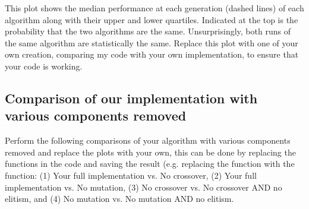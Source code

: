 \documentclass{article}
\begin{document}
	This plot shows the median performance at each generation (dashed lines) of each algorithm along with their upper and lower quartiles. Indicated at the top is the probability that the two algorithms are the same. Unsurprisingly, both runs of the same algorithm are statistically the same. Replace this plot with one of your own creation, comparing my code with your own implementation, to ensure that your code is working.
\newpage
\subsection*{Comparison of our implementation with various components removed}
	Perform the following comparisons of your algorithm with various components removed and replace the plots with your own, this can be done by replacing the functions in the code and saving the result (e.g. replacing the  function with the  function: (1) Your full implementation vs. No crossover, (2) Your full implementation vs. No mutation, (3) No crossover vs. No crossover AND no elitism, and (4) No mutation  vs. No mutation AND no elitism.
	\newpage
\end{document}
